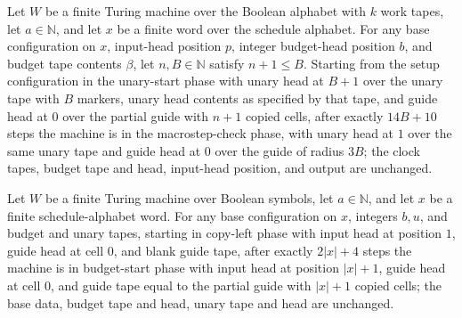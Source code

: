 \begin{lemma}
\label{Complexity.setupCfg_allocation}
\leanok
{}
Let $W$ be a finite Turing machine over the Boolean alphabet with $k$ work tapes, let $a
\in \mathbb{N}$, and let $x$ be a finite word over the schedule alphabet. For any base
configuration on $x$, input-head position $p$, integer budget-head position $b$, and
budget tape contents $\beta$, let $n,B \in \mathbb{N}$ satisfy $n+1 \le B$. Starting
from the setup configuration in the unary-start phase with unary head at $B+1$ over the
unary tape with $B$ markers, unary head contents as specified by that tape, and guide
head at $0$ over the partial guide with $n+1$ copied cells, after exactly $14B+10$ steps
the machine is in the macrostep-check phase, with unary head at $1$ over the same unary
tape and guide head at $0$ over the guide of radius $3B$; the clock tapes, budget tape
and head, input-head position, and output are unchanged.
\end{lemma}

\begin{lemma}
\label{Complexity.setupCfg_copy}
\leanok
{}
Let $W$ be a finite Turing machine over Boolean symbols, let $a\in\mathbb{N}$, and let
$x$ be a finite schedule-alphabet word. For any base configuration on $x$, integers
$b,u$, and budget and unary tapes, starting in copy-left phase with input head at
position $1$, guide head at cell $0$, and blank guide tape, after exactly $2|x|+4$ steps
the machine is in budget-start phase with input head at position $|x|+1$, guide head at
cell $0$, and guide tape equal to the partial guide with $|x|+1$ copied cells; the base
data, budget tape and head, unary tape and head are unchanged.
\end{lemma}

